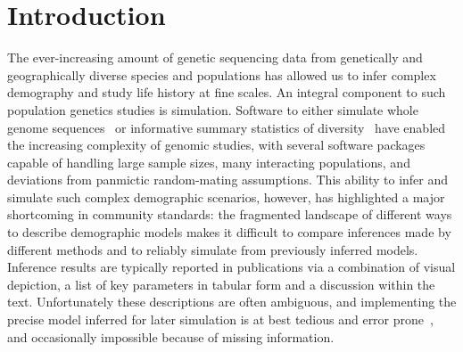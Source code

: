 \documentclass[11pt]{article}
\newcommand{\mhcomment}[1]{{\textcolor{cyan}{MH: #1}}}
\begin{document}
\section*{Introduction}

The ever-increasing amount of genetic sequencing data from genetically and
geographically diverse species and populations has allowed us to infer complex
demography and study life history at fine scales.
An integral component to such population genetics studies is simulation.
Software to either simulate whole genome
sequences~\citep{thornton2014cpp,thornton2019-nu,staab2015scrm,
baumdicker2021-iu,kelleher2016efficient,haller2019slim}
or informative summary statistics of
diversity~\citep{gutenkunst2009inferring,kamm2017efficient,jouganous2017inferring}
have enabled the increasing complexity of genomic studies, with several software
packages capable of handling large sample sizes, many interacting populations, and
deviations from panmictic random-mating assumptions.
This ability to infer and simulate such complex demographic scenarios, however,
has highlighted a major shortcoming in community standards:
the fragmented landscape of different ways to describe demographic
models makes it difficult to compare inferences made by different methods
and to reliably simulate from previously inferred models.
Inference results are typically reported in publications
via a combination of visual depiction,
a list of key parameters in tabular form and a discussion within the text.
Unfortunately these descriptions are often ambiguous, and
implementing the precise model inferred for later simulation
is at best tedious and error prone~\citep{adrion2020community,ragsdale2020lessons},
and occasionally impossible because of missing information.
\end{document}

